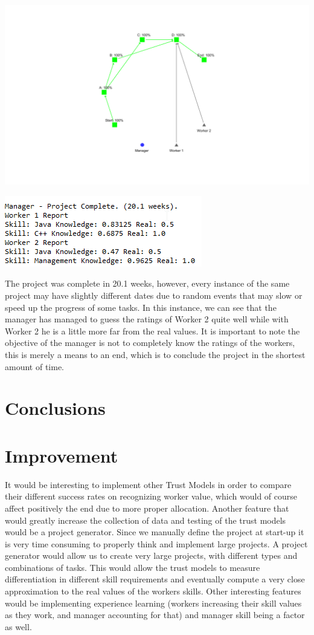 \documentclass[paper=a4, fontsize=11pt]{scrartcl} %
\numberwithin{equation}{section} %
\numberwithin{figure}{section} %
\numberwithin{table}{section} %
\begin{document}
\includegraphics[scale=0.3]{exp3.png}
\begin{center}
	\includegraphics[scale=1]{data2.png}
\end{center}
The project was complete in 20.1 weeks, however, every instance of the same project may have slightly different dates due to random events that may slow or speed up the progress of some tasks. In this instance, we can see that the manager has managed to guess the ratings of Worker 2 quite well while with Worker 2 he is a little more far from the real values. It is important to note the objective of the manager is not to completely know the ratings of the workers, this is merely a means to an end, which is to conclude the project in the shortest amount of time.
\section{Conclusions}

\section{Improvement}
It would be interesting to implement other Trust Models in order to compare their different success rates on recognizing worker value, which would of course affect positively the end due to more proper allocation. Another feature that would greatly increase the collection of data and testing of the trust models would be a project generator. Since we manually define the project at start-up it is very time consuming to properly think and implement large projects. A project generator would allow us to create very large projects, with different types and combinations of tasks. This would allow the trust models to measure differentiation in different skill requirements and eventually compute a very close approximation to the real values of the workers skills. Other interesting features would be implementing experience learning (workers increasing their skill values as they work, and manager accounting for that) and manager skill being a factor as well.
\end{document}
